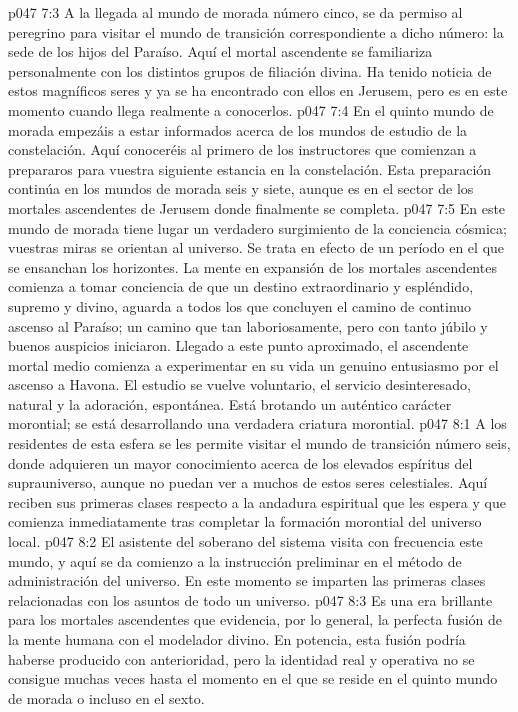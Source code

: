 \vs p047 7:3 A la llegada al mundo de morada número cinco, se da permiso al peregrino para visitar el mundo de transición correspondiente a dicho número: la sede de los hijos del Paraíso. Aquí el mortal ascendente se familiariza personalmente con los distintos grupos de filiación divina. Ha tenido noticia de estos magníficos seres y ya se ha encontrado con ellos en Jerusem, pero es en este momento cuando llega realmente a conocerlos.
\vs p047 7:4 En el quinto mundo de morada empezáis a estar informados acerca de los mundos de estudio de la constelación. Aquí conoceréis al primero de los instructores que comienzan a prepararos para vuestra siguiente estancia en la constelación. Esta preparación continúa en los mundos de morada seis y siete, aunque es en el sector de los mortales ascendentes de Jerusem donde finalmente se completa.
\vs p047 7:5 En este mundo de morada tiene lugar un verdadero surgimiento de la conciencia cósmica; vuestras miras se orientan al universo. Se trata en efecto de un período en el que se ensanchan los horizontes. La mente en expansión de los mortales ascendentes comienza a tomar conciencia de que un destino extraordinario y espléndido, supremo y divino, aguarda a todos los que concluyen el camino de continuo ascenso al Paraíso; un camino que tan laboriosamente, pero con tanto júbilo y buenos auspicios iniciaron. Llegado a este punto aproximado, el ascendente mortal medio comienza a experimentar en su vida un genuino entusiasmo por el ascenso a Havona. El estudio se vuelve voluntario, el servicio desinteresado, natural y la adoración, espontánea. Está brotando un auténtico carácter morontial; se está desarrollando una verdadera criatura morontial.
\vs p047 8:1 A los residentes de esta esfera se les permite visitar el mundo de transición número seis, donde adquieren un mayor conocimiento acerca de los elevados espíritus del suprauniverso, aunque no puedan ver a muchos de estos seres celestiales. Aquí reciben sus primeras clases respecto a la andadura espiritual que les espera y que comienza inmediatamente tras completar la formación morontial del universo local.
\vs p047 8:2 El asistente del soberano del sistema visita con frecuencia este mundo, y aquí se da comienzo a la instrucción preliminar en el método de administración del universo. En este momento se imparten las primeras clases relacionadas con los asuntos de todo un universo.
\vs p047 8:3 \pc Es una era brillante para los mortales ascendentes que evidencia, por lo general, la perfecta fusión de la mente humana con el modelador divino. En potencia, esta fusión podría haberse producido con anterioridad, pero la identidad real y operativa no se consigue muchas veces hasta el momento en el que se reside en el quinto mundo de morada o incluso en el sexto.
